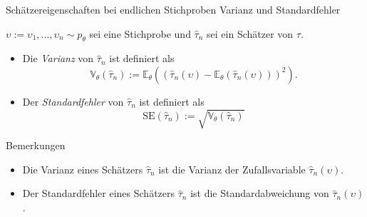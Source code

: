 \documentclass[
  8pt,
  ignorenonframetext,
]{beamer}
\providecommand{\tightlist}{%
  \setlength{\itemsep}{0pt}\setlength{\parskip}{0pt}}
\newcommand{\ups} {\upsilon}
\begin{document}
\begin{frame}{\small Schätzereigenschaften bei endlichen Stichproben
\textbar{} Varianz und Standardfehler}
\protect\hypertarget{schuxe4tzereigenschaften-bei-endlichen-stichproben-varianz-und-standardfehler}{}
\small
\begin{definition}
$\ups := \ups_1,...,\ups_n \sim  p_\theta$ sei eine Stichprobe und $\hat{\tau}_n$ sei ein Schätzer von $\tau$.
\begin{itemize}
\item Die \textit{Varianz} von $\hat{\tau}_n$ ist definiert als
\begin{equation}
\mathbb{V}_\theta(\hat{\tau}_n) :=
\mathbb{E}_\theta
\left((\hat{\tau}_n(\ups) - \mathbb{E}_\theta(\hat{\tau}_n(\ups)))^2\right).
\end{equation}
\item Der \textit{Standardfehler} von $\hat{\tau}_n$ ist definiert als
\begin{equation}
\mbox{SE}(\hat{\tau}_n) := \sqrt{\mathbb{V}_\theta(\hat{\tau}_n)}
\end{equation}
\end{itemize}
\end{definition}

Bemerkungen

\begin{itemize}
\tightlist
\item
  Die Varianz eines Schätzers \(\hat{\tau}_n\) ist die Varianz der
  Zufallsvariable \(\hat{\tau}_n(\ups)\).
\item
  Der Standardfehler eines Schätzers \(\hat{\tau}_n\) ist die
  Standardabweichung von \(\hat{\tau}_n(\ups)\).
\end{itemize}
\end{frame}
\end{document}
